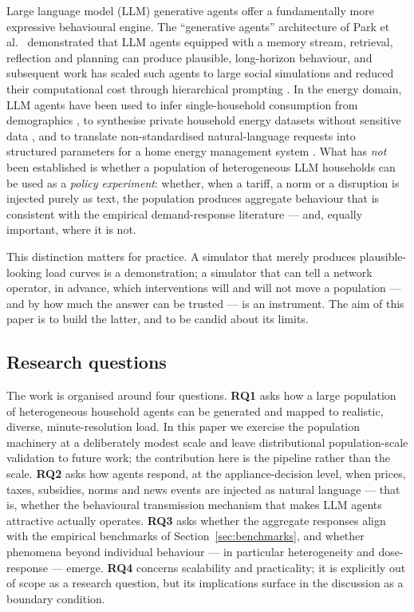 \documentclass[11pt]{article}
\begin{document}
Large language model (LLM) generative agents offer a fundamentally more expressive behavioural engine.
The ``generative agents'' architecture of Park et al.\ \cite{park2023} demonstrated that LLM agents
equipped with a memory stream, retrieval, reflection and planning can produce plausible, long-horizon
behaviour, and subsequent work has scaled such agents to large social simulations \cite{piao2025} and
reduced their computational cost through hierarchical prompting \cite{koley2025}. In the energy domain,
LLM agents have been used to infer single-household consumption from demographics \cite{chetty2025}, to
synthesise private household energy datasets without sensitive data \cite{almashor2024}, and to translate
non-standardised natural-language requests into structured parameters for a home energy management system
\cite{michelon2025}. What has \emph{not} been established is whether a population of heterogeneous LLM
households can be used as a \emph{policy experiment}: whether, when a tariff, a norm or a disruption is
injected purely as text, the population produces aggregate behaviour that is consistent with the
empirical demand-response literature --- and, equally important, where it is not.

This distinction matters for practice. A simulator that merely produces plausible-looking load curves is
a demonstration; a simulator that can tell a network operator, in advance, which interventions will and
will not move a population --- and by how much the answer can be trusted --- is an instrument. The aim of
this paper is to build the latter, and to be candid about its limits.

\subsection{Research questions}
The work is organised around four questions. \textbf{RQ1} asks how a large population of heterogeneous
household agents can be generated and mapped to realistic, diverse, minute-resolution load. In this paper
we exercise the population machinery at a deliberately modest scale and leave distributional
population-scale validation to future work; the contribution here is the pipeline rather than the scale.
\textbf{RQ2} asks how agents respond, at the appliance-decision level, when prices, taxes, subsidies,
norms and news events are injected as natural language --- that is, whether the behavioural transmission
mechanism that makes LLM agents attractive actually operates. \textbf{RQ3} asks whether the aggregate
responses align with the empirical benchmarks of Section~\ref{sec:benchmarks}, and whether phenomena
beyond individual behaviour --- in particular heterogeneity and dose-response --- emerge. \textbf{RQ4}
concerns scalability and practicality; it is explicitly out of scope as a research question, but its
implications surface in the discussion as a boundary condition.
\end{document}
